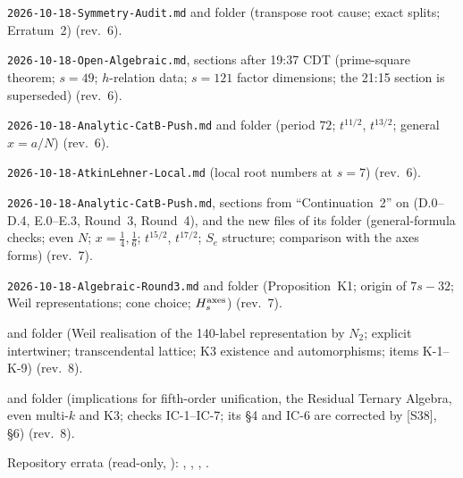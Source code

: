\documentclass[11pt]{article}
\theoremstyle{definition}
\theoremstyle{plain}
\begin{document}
\begin{enumerate}[label={[S\arabic*]},leftmargin=3em]
\item \texttt{2026-10-18-Symmetry-Audit.md} and folder (transpose root cause; exact splits; Erratum~2) (rev.~6).
\item \texttt{2026-10-18-Open-Algebraic.md}, sections after 19:37 CDT (prime-square theorem; $s=49$; $h$-relation data; $s=121$ factor dimensions; the 21:15 section is superseded) (rev.~6).
\item \texttt{2026-10-18-Analytic-CatB-Push.md} and folder (period $72$; $t^{11/2}$, $t^{13/2}$; general $x=a/N$) (rev.~6).
\item \texttt{2026-10-18-AtkinLehner-Local.md} (local root numbers at $s=7$) (rev.~6).
\item \texttt{2026-10-18-Analytic-CatB-Push.md}, sections from ``Continuation~2'' on (D.0--D.4, E.0--E.3, Round~3, Round~4), and the new files of its folder (general-formula checks; even $N$; $x=\tfrac14,\tfrac16$; $t^{15/2}$, $t^{17/2}$; $S_e$ structure; comparison with the axes forms) (rev.~7).
\item \texttt{2026-10-18-Algebraic-Round3.md} and folder (Proposition~K1; origin of $7s-32$; Weil representations; cone choice; $H_s^{\rm axes}$) (rev.~7).
\item {} and folder  (Weil realisation of the 140-label representation by $N_2$; explicit intertwiner; transcendental lattice; K3 existence and automorphisms; items K-1--K-9) (rev.~8).
\item {} and folder  (implications for fifth-order unification, the Residual Ternary Algebra, even multi-$k$ and K3; checks IC-1--IC-7; its \S4 and IC-6 are corrected by [S38], \S6) (rev.~8).
\end{enumerate}
Repository errata (read-only, ): ,
, ,
.
\end{document}

